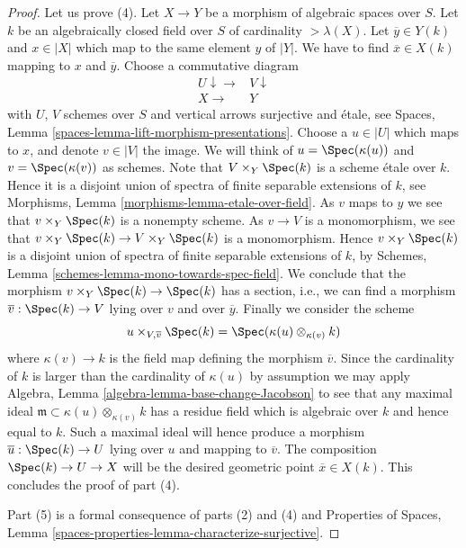 \begin{proof}
\medskip\noindent
Let us prove (4). Let $X \to Y$ be a morphism of algebraic spaces over $S$.
Let $k$ be an algebraically closed field over $S$ of cardinality
$> \lambda(X)$. Let $\overline{y} \in Y(k)$ and $x \in |X|$ which map to the
same element $y$ of $|Y|$.
We have to find $\overline{x} \in X(k)$ mapping to $x$ and $\overline{y}$.
Choose a commutative diagram
$$
\begin{array}{cc}U \downarrow\longrightarrow & V \downarrow \\ X \longrightarrow & Y\end{array}
$$
with $U$, $V$ schemes over $S$ and vertical arrows surjective
and \'etale, see
Spaces, Lemma \ref{spaces-lemma-lift-morphism-presentations}.
Choose a $u \in |U|$ which maps to $x$, and denote $v \in |V|$ the image.
We will think of $u = \Spec(\kappa(u))$ and
$v = \Spec(\kappa(v))$ as schemes.
Note that $V \times_Y \Spec(k)$ is a scheme \'etale over $k$.
Hence it is a disjoint union of spectra of finite separable
extensions of $k$, see
Morphisms, Lemma \ref{morphisms-lemma-etale-over-field}.
As $v$ maps to $y$ we see that $v \times_Y \Spec(k)$ is a
nonempty scheme. As $v \to V$ is a monomorphism, we see that
$v \times_Y \Spec(k) \to V \times_Y \Spec(k)$
is a monomorphism. Hence $v \times_Y \Spec(k)$ is a disjoint
union of spectra of finite separable extensions of $k$, by
Schemes, Lemma \ref{schemes-lemma-mono-towards-spec-field}.
We conclude that the morphism
$v \times_Y \Spec(k) \to \Spec(k)$
has a section, i.e., we can find a morphism
$\overline{v} : \Spec(k) \to V$ lying over $v$ and over
$\overline{y}$. Finally we consider the scheme
$$
u \times_{V, \overline{v}} \Spec(k)
=
\Spec(\kappa(u) \otimes_{\kappa(v)} k)
$$
where $\kappa(v) \to k$ is the field map defining the morphism
$\overline{v}$. Since the cardinality of $k$ is larger than the cardinality
of $\kappa(u)$ by assumption we may apply
Algebra, Lemma \ref{algebra-lemma-base-change-Jacobson}
to see that any maximal ideal
$\mathfrak m \subset \kappa(u) \otimes_{\kappa(v)} k$
has a residue field which is algebraic over $k$ and hence equal to $k$.
Such a maximal ideal will hence produce a morphism
$\overline{u} : \Spec(k) \to U$ lying over $u$ and mapping to
$\overline{v}$. The composition $\Spec(k) \to U \to X$
will be the desired geometric point $\overline{x} \in X(k)$.
This concludes the proof of part (4).

\medskip\noindent
Part (5) is a formal consequence of parts (2) and (4) and
Properties of Spaces,
Lemma \ref{spaces-properties-lemma-characterize-surjective}.
\end{proof}


